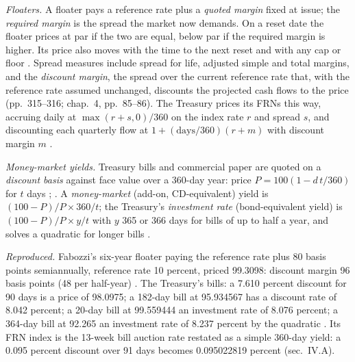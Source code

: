 \begin{qfmethod}\label{meth:floating-money-market-yields}
 \emph{Floaters.} A floater pays a reference rate plus a \emph{quoted margin} fixed at issue; the \emph{required margin} is the spread the market now demands. On a reset date the floater prices at par if the two are equal, below par if the required margin is higher. Its price also moves with the time to the next reset and with any cap or floor \citep[chap.~14, pp.~312--318]{s7-fabozzifixed}. Spread measures include spread for life, adjusted simple and total margins, and the \emph{discount margin}, the spread over the current reference rate that, with the reference rate assumed unchanged, discounts the projected cash flows to the price (pp.~315--316; chap.~4, pp.~85--86). The Treasury prices its FRNs this way, accruing daily at $\max(r+s,0)/360$ on the index rate $r$ and spread $s$, and discounting each quarterly flow at $1+(\text{days}/360)(r+m)$ with discount margin $m$ \citep[sec.~IV.A]{cfr-31-356-appendix-b}.

\emph{Money-market yields.} Treasury bills and commercial paper are quoted on a \emph{discount basis} against face value over a 360-day year: price $P=100(1-d\,t/360)$ for $t$ days \citep[sec.~VI.A]{cfr-31-356-appendix-b}; \citep[chap.~13, p.~301]{s7-fabozzifixed}. A \emph{money-market} (add-on, CD-equivalent) yield is $(100-P)/P\times360/t$; the Treasury's \emph{investment rate} (bond-equivalent yield) is $(100-P)/P\times y/t$ with $y$ 365 or 366 days for bills of up to half a year, and solves a quadratic for longer bills \citep[sec.~VI.D]{cfr-31-356-appendix-b}.

 \emph{Reproduced.} Fabozzi's six-year floater paying the reference rate plus 80 basis points semiannually, reference rate 10 percent, priced 99.3098: discount margin 96 basis points (48 per half-year) \citep[chap.~4, Exhibit~4-7, p.~86]{s7-fabozzifixed}. The Treasury's bills: a 7.610 percent discount for 90 days is a price of 98.0975; a 182-day bill at 95.934567 has a discount rate of 8.042 percent; a 20-day bill at 99.559444 an investment rate of 8.076 percent; a 364-day bill at 92.265 an investment rate of 8.237 percent by the quadratic \citep[secs.~VI.A, C and~D]{cfr-31-356-appendix-b}. Its FRN index is the 13-week bill auction rate restated as a simple 360-day yield: a 0.095 percent discount over 91 days becomes 0.095022819 percent (sec.~IV.A).


\end{qfmethod}
